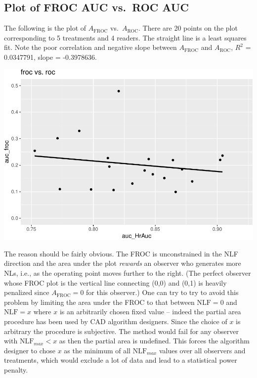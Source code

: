 \documentclass[
]{book}
\begin{document}
\hypertarget{plot-of-froc-auc-vs.-roc-auc}{%
\subsection{Plot of FROC AUC vs.~ROC AUC}\label{plot-of-froc-auc-vs.-roc-auc}}

The following is the plot of \(A_{\text{FROC}}\) vs.~\(A_{\text{ROC}}\). There are 20 points on the plot corresponding to 5 treatments and 4 readers. The straight line is a least squares fit. Note the poor correlation and negative slope between \(A_{\text{FROC}}\) and \(A_{\text{ROC}}\), \(R^2\) = 0.0347791, slope = -0.3978636.

\includegraphics{03-empirical_files/figure-latex/unnamed-chunk-26-1.pdf}

The reason should be fairly obvious. The FROC is unconstrained in the NLF direction and the area under the plot \emph{rewards} an observer who generates more NLs, i.e., as the operating point moves further to the right. (The perfect observer whose FROC plot is the vertical line connecting (0,0) and (0,1) is heavily penalized since \(A_{\text{FROC}} = 0\) for this observer.) One can try to try to avoid this problem by limiting the area under the FROC to that between \(\text{NLF} = 0\) and \(\text{NLF} = x\) where \(x\) is an arbitrarily chosen fixed value -- indeed the partial area procedure has been used by CAD algorithm designers. Since the choice of \(x\) is arbitrary the procedure is subjective. The method would fail for any observer with \(\text{NLF}_{max} < x\) as then the partial area is undefined. This forces the algorithm designer to chose \(x\) as the minimum of all \(\text{NLF}_{max}\) values over all observers and treatments, which would exclude a lot of data and lead to a statistical power penalty.
\end{document}
